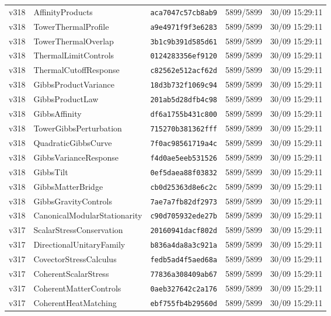 \documentclass[11pt]{article}
\theoremstyle{definition}\newtheorem{deriv}{Derivation}
\begin{document}
{\begin{longtable}{@{}lllll@{}}
v318 & AffinityProducts & \texttt{aca7047c57cb8ab9} & 5899/5899 & 30/09 15:29:11 \\
v318 & TowerThermalProfile & \texttt{a9e4971f9f3e6283} & 5899/5899 & 30/09 15:29:11 \\
v318 & TowerThermalOverlap & \texttt{3b1c9b391d585d61} & 5899/5899 & 30/09 15:29:11 \\
v318 & ThermalLimitControls & \texttt{0124283356ef9120} & 5899/5899 & 30/09 15:29:11 \\
v318 & ThermalCutoffResponse & \texttt{c82562e512acf62d} & 5899/5899 & 30/09 15:29:11 \\
v318 & GibbsProductVariance & \texttt{18d3b732f1069c94} & 5899/5899 & 30/09 15:29:11 \\
v318 & GibbsProductLaw & \texttt{201ab5d28dfb4c98} & 5899/5899 & 30/09 15:29:11 \\
v318 & GibbsAffinity & \texttt{df6a1755b431c800} & 5899/5899 & 30/09 15:29:11 \\
v318 & TowerGibbsPerturbation & \texttt{715270b381362fff} & 5899/5899 & 30/09 15:29:11 \\
v318 & QuadraticGibbsCurve & \texttt{7f0ac98561719a4c} & 5899/5899 & 30/09 15:29:11 \\
v318 & GibbsVarianceResponse & \texttt{f4d0ae5eeb531526} & 5899/5899 & 30/09 15:29:11 \\
v318 & GibbsTilt & \texttt{0ef5daea88f03832} & 5899/5899 & 30/09 15:29:11 \\
v318 & GibbsMatterBridge & \texttt{cb0d25363d8e6c2c} & 5899/5899 & 30/09 15:29:11 \\
v318 & GibbsGravityControls & \texttt{7ae7a7fb82df2973} & 5899/5899 & 30/09 15:29:11 \\
v318 & CanonicalModularStationarity & \texttt{c90d705932ede27b} & 5899/5899 & 30/09 15:29:11 \\
v317 & ScalarStressConservation & \texttt{20160941dacf802d} & 5899/5899 & 30/09 15:29:11 \\
v317 & DirectionalUnitaryFamily & \texttt{b836a4da8a3c921a} & 5899/5899 & 30/09 15:29:11 \\
v317 & CovectorStressCalculus & \texttt{fedb5ad4f5aed68a} & 5899/5899 & 30/09 15:29:11 \\
v317 & CoherentScalarStress & \texttt{77836a308409ab67} & 5899/5899 & 30/09 15:29:11 \\
v317 & CoherentMatterControls & \texttt{0aeb327642c2a176} & 5899/5899 & 30/09 15:29:11 \\
v317 & CoherentHeatMatching & \texttt{ebf755fb4b29560d} & 5899/5899 & 30/09 15:29:11 \\

\end{longtable}}
\end{document}
